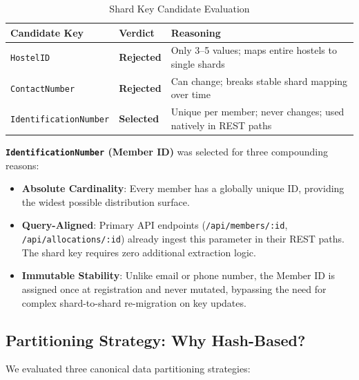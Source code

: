 \documentclass[sigconf]{acmart}
\newcommand{\theadbf}[1]{\textbf{#1}}
\begin{document}
\begin{table}[H]
\centering
\caption{Shard Key Candidate Evaluation}
\label{tab:shardkey}
\small
\renewcommand{\arraystretch}{1.3}
\begin{tabular}{|L{2.0cm}|L{1.5cm}|L{3.0cm}|}
\hline
{}\color{white}\theadbf{Candidate Key} & \color{white}\theadbf{Verdict} & \color{white}\theadbf{Reasoning} \\
\hline
{}\texttt{HostelID} & \textbf{Rejected} & Only 3--5 values; maps entire hostels to single shards \\
\hline
{}\texttt{ContactNumber} & \textbf{Rejected} & Can change; breaks stable shard mapping over time \\
\hline
{}\texttt{IdentificationNumber} & \textbf{Selected} & Unique per member; never changes; used natively in REST paths \\
\hline
\end{tabular}
\end{table}

\textbf{\texttt{IdentificationNumber} (Member ID)} was selected for three compounding reasons:
\begin{itemize}[leftmargin=*]
    \item \textbf{Absolute Cardinality}: Every member has a globally unique ID, providing the widest possible distribution surface.
    \item \textbf{Query-Aligned}: Primary API endpoints (\texttt{/api/members/:id}, \texttt{/api/allocations/:id}) already ingest this parameter in their REST paths. The shard key requires zero additional extraction logic.
    \item \textbf{Immutable Stability}: Unlike email or phone number, the Member ID is assigned once at registration and never mutated, bypassing the need for complex shard-to-shard re-migration on key updates.
\end{itemize}

\subsection{Partitioning Strategy: Why Hash-Based?}
\label{subsec:partitioning}

We evaluated three canonical data partitioning strategies:
\end{document}
